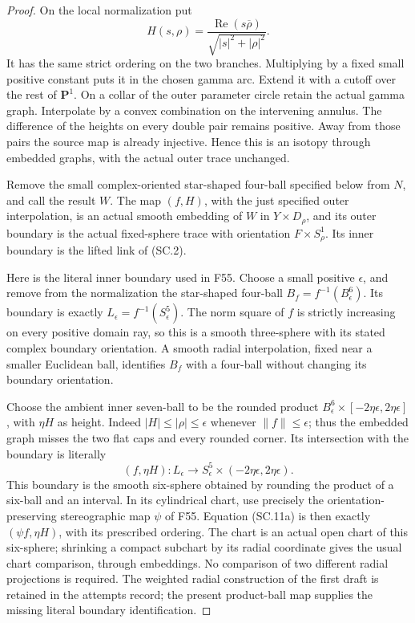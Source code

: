 \begin{proof}
On the local normalization put
\[
 H(s,\rho)=\frac{\operatorname{Re}(s\overline\rho)}
                  {\sqrt{|s|^2+|\rho|^2}}.          \tag{SC.11}
\]
It has the same strict ordering on the two branches. Multiplying by a
fixed small positive constant puts it in the chosen gamma arc. Extend
it with a cutoff over the rest of \(\mathbf P^1\). On a collar of the
outer parameter circle retain the actual gamma graph. Interpolate by
a convex combination on the intervening annulus. The difference of
the heights on every double pair remains positive. Away from those
pairs the source map is already injective. Hence this is an isotopy
through embedded graphs, with the actual outer trace unchanged.

Remove the small complex-oriented star-shaped four-ball specified below from \(N\), and call
the result \(W\). The map \((f,H)\), with the just specified outer
interpolation, is an actual smooth embedding of \(W\) in
\(Y\times D_\rho\), and its outer boundary is the actual fixed-sphere
trace with orientation \(F\times S^1_\rho\). Its inner boundary is the
lifted link of (SC.2).

Here is the literal inner boundary used in F55. Choose a small positive
\(\epsilon\), and remove from the normalization the star-shaped four-ball
\(B_f=f^{-1}(B^6_\epsilon)\). Its boundary is exactly
\(L_\epsilon=f^{-1}(S^5_\epsilon)\). The norm square of \(f\) is
strictly increasing on every positive domain ray, so this is a smooth
three-sphere with its stated complex boundary orientation. A smooth
radial interpolation, fixed near a smaller Euclidean ball, identifies
\(B_f\) with a four-ball without changing its boundary orientation.

Choose the ambient inner seven-ball to be the rounded product
\(B^6_\epsilon\times[-2\eta\epsilon,2\eta\epsilon]\), with
\(\eta H\) as height. Indeed \(|H|\leq|\rho|\leq\epsilon\) whenever
\(\|f\|\leq\epsilon\); thus the embedded graph misses the two flat
caps and every rounded corner. Its intersection with the boundary is
literally
\[
 (f,\eta H):L_\epsilon\longrightarrow
                 S^5_\epsilon\times(-2\eta\epsilon,2\eta\epsilon).
                                                               \tag{SC.11a}
\]
This boundary is the smooth six-sphere obtained by rounding the product
of a six-ball and an interval. In its cylindrical chart, use precisely
the orientation-preserving stereographic map \(\psi\) of F55. Equation
(SC.11a) is then exactly \((\psi f,\eta H)\), with its prescribed
ordering. The chart is an actual open chart of this six-sphere; shrinking
a compact subchart by its radial coordinate gives the usual chart
comparison, through embeddings. No comparison of two different radial
projections is required. The weighted radial construction of the first
draft is retained in the attempts record; the present product-ball map
supplies the missing literal boundary identification.


\end{proof}
